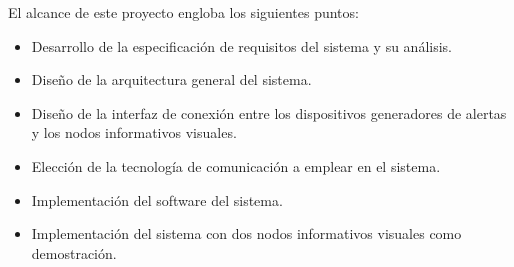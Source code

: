 El alcance de este proyecto engloba los siguientes puntos:
\begin{itemize}
    \item Desarrollo de la especificación de requisitos del sistema y su análisis.
    \item Diseño de la arquitectura general del sistema.
    \item Diseño de la interfaz de conexión entre los dispositivos generadores de alertas y los nodos informativos visuales.
    \item Elección de la tecnología de comunicación a emplear en el sistema.
    \item Implementación del software del sistema.
    \item Implementación del sistema con dos nodos informativos visuales como demostración. 
\end{itemize}